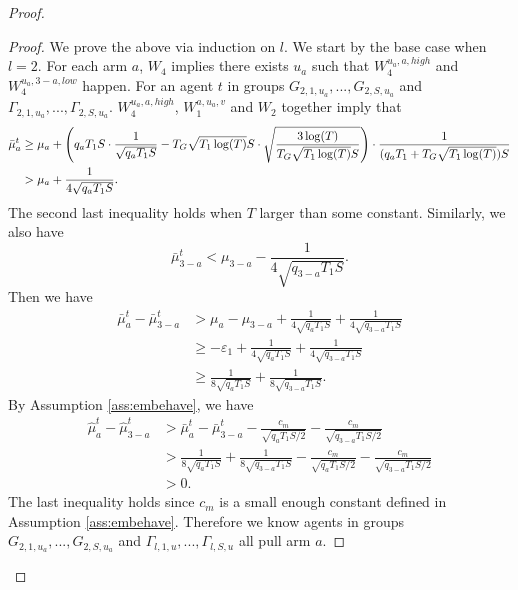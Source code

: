 \begin{proof}
\begin{proof}
We prove the above via induction on $l$. %
We start by the base case when $l=2$. For each arm $a$, $W_4$ implies there exists $u_a$ such that $W^{u_a,a,high}_4$ and $W^{u_a,3-a,low}_4$ happen. For an agent $t$  in groups $G_{2,1,u_a},...,G_{2,S,u_a}$ and $\Gamma_{2,1,u_a},...,\Gamma_{2,S,u_a}$.
$W_4^{u_a,a,high}$,  $W_1^{a,u_a,v}$ and $W_2$ together imply that 
\begin{align*}
\bar{\mu}_a ^t &\geq \mu_a + \left(q_aT_1S \cdot \frac{1}{\sqrt{q_aT_1S}} - T_G \sqrt{T_1\log(T)} S\cdot \sqrt{\frac{3\log(T)}{ T_G \sqrt{T_1\log(T)}S}} \right) \cdot \frac{1}{(q_a T_1+ T_G \sqrt{T_1\log(T)})S} \\
&> \mu_a + \frac{1}{4\sqrt{q_aT_1S}}.
\end{align*}
The second last inequality holds when $T$ larger than some constant.
Similarly, we also have
\[
\bar{\mu}_{3-a}^t< \mu_{3-a}   - \frac{1}{4\sqrt{q_{3-a} T_1S}}.
\]
Then we have
\begin{align*}
\bar{\mu}^t_a - \bar{\mu}^t_{3-a} &> \mu_a - \mu_{3-a} + \frac{1}{4\sqrt{q_aT_1S}} + \frac{1}{4\sqrt{q_{3-a} T_1S}}\\
&\geq -\varepsilon_1+ \frac{1}{4\sqrt{q_aT_1S}} + \frac{1}{4\sqrt{q_{3-a} T_1S}}\\
&\geq \frac{1}{8\sqrt{q_aT_1S}} + \frac{1}{8\sqrt{q_{3-a} T_1S}}.
\end{align*}
By Assumption \ref{ass:embehave}, we have
\begin{align*}
\hat{\mu}_a^t - \hat{\mu}_{3-a}^t &> \bar{\mu}^t_a - \bar{\mu}^t_{3-a} -  \frac{c_m}{\sqrt{q_aT_1S/2}} - \frac{c_m}{\sqrt{q_{3-a} T_1S/2}}\\
&> \frac{1}{8\sqrt{q_aT_1S}} + \frac{1}{8\sqrt{q_{3-a} T_1S}} -   \frac{c_m}{\sqrt{q_aT_1S/2}} - \frac{c_m}{\sqrt{q_{3-a} T_1S/2}}\\
&>0.
\end{align*}
The last inequality holds since $c_m$ is a small enough constant defined in Assumption \ref{ass:embehave}. Therefore we know agents in groups $G_{2,1,u_a},...,G_{2,S,u_a}$ and $\Gamma_{l,1,u},...,\Gamma_{l,S,u}$ all pull arm $a$.


\end{proof}
\end{proof}

